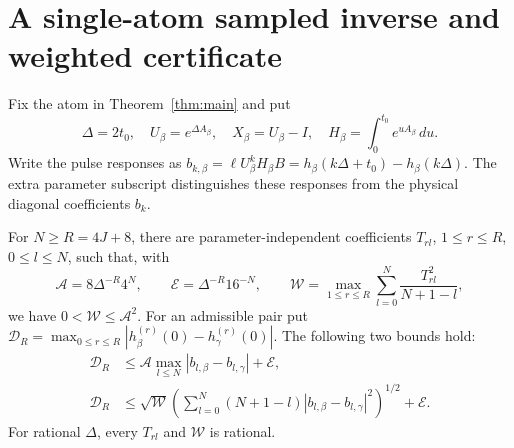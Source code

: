 \section{A single-atom sampled inverse and weighted certificate}
\label{sec:sampled}
Fix the atom in Theorem~\ref{thm:main} and put
\[
 \Delta=2t_0,\quad U_\beta=e^{\Delta A_\beta},\quad X_\beta=U_\beta-I,
 \quad H_\beta=\int_0^{t_0}e^{uA_\beta}\,du.
\]
Write the pulse responses as $b_{k,\beta}=\ell U_\beta^kH_\beta B
=h_\beta(k\Delta+t_0)-h_\beta(k\Delta)$.
The extra parameter subscript distinguishes these responses from the physical
diagonal coefficients $b_k$.

\begin{lemma}
\label{lem:sampled}
For $N\ge R=4J+8$, there are parameter-independent coefficients $T_{r l}$,
$1\le r\le R$, $0\le l\le N$, such that, with
\begin{equation}
 \mathcal A=8\Delta^{-R}4^N,\qquad
 \mathcal E=\Delta^{-R}16^{-N},\qquad
 \mathcal W=\max_{1\le r\le R}\sum_{l=0}^N\frac{T_{rl}^2}{N+1-l},
 \label{eq:transform-budgets}
\end{equation}
we have $0<\mathcal W\le\mathcal A^2$. For an admissible pair put
$\mathcal D_R=\max_{0\le r\le R}|h_\beta^{(r)}(0)-h_\gamma^{(r)}(0)|$.
The following two bounds hold:
\begin{align}
 \mathcal D_R&\le\mathcal A\max_{l\le N}|b_{l,\beta}-b_{l,\gamma}|+\mathcal E,
 \label{eq:sampled-infty}\\
 \mathcal D_R&\le\sqrt{\mathcal W}
 \left(\sum_{l=0}^N(N+1-l)|b_{l,\beta}-b_{l,\gamma}|^2\right)^{1/2}
 +\mathcal E.\label{eq:sampled-weighted}
\end{align}
For rational $\Delta$, every $T_{rl}$ and $\mathcal W$ is rational.
\end{lemma}
